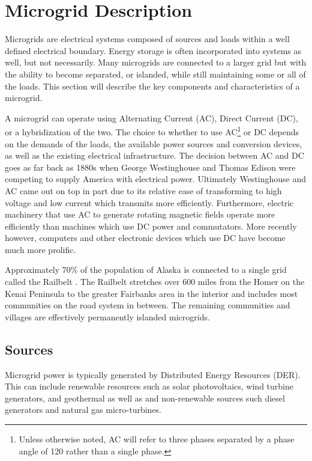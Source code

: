 \section{Microgrid Description}
Microgrids are electrical systems composed of sources and loads within a well defined electrical boundary. Energy storage is often incorporated into systems as well, but not necessarily. Many microgrids are connected to a larger grid but with the ability to become separated, or islanded, while still maintaining some or all of the loads. This section will describe the key components and characteristics of a microgrid.

A microgrid can operate using Alternating Current (AC), Direct Current (DC), or a hybridization of the two. The choice to whether to use AC\footnote{Unless otherwise noted, AC will refer to three phases separated by a phase angle of 120\textdegree{} rather than a single phase.} or DC depends on the demands of the loads, the available power sources and conversion devices, as well as the existing electrical infrastructure. The decision between AC and DC goes as far back as 1880s when George Westinghouse and Thomas Edison were competing to supply America with electrical power. Ultimately Westinghouse and AC came out on top in part due to its relative ease of transforming to high voltage and low current which transmits more efficiently. Furthermore, electric machinery that use AC to generate rotating magnetic fields operate more efficiently than machines which use DC power and commutators. More recently however, computers and other electronic devices which use DC have become much more prolific.  

Approximately 70\% of the population of Alaska is connected to a single grid called the Railbelt \cite{railbelt}. The Railbelt stretches over 600 miles from the Homer on the Kenai Peninsula to the greater Fairbanks area in the interior and includes most communities on the road system in between. The remaining communities and villages are effectively permanently islanded microgrids. 

\subsection{Sources}
Microgrid power is typically generated by Distributed Energy Resources (DER). This can include renewable resources such as solar photovoltaics, wind turbine generators, and geothermal as well as and non-renewable sources such diesel generators and natural gas micro-turbines. 

